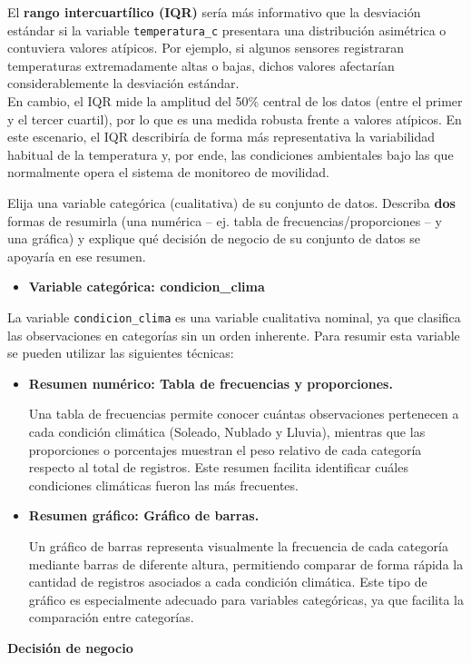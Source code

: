 \documentclass[11pt]{article}
\begin{document}
El \textbf{rango intercuartílico (IQR)} sería más informativo que la desviación estándar si la variable \texttt{temperatura\_c} presentara una distribución asimétrica o contuviera valores atípicos. Por ejemplo, si algunos sensores registraran temperaturas extremadamente altas o bajas, dichos valores afectarían considerablemente la desviación estándar. \\
En cambio, el IQR mide la amplitud del 50\% central de los datos (entre el primer y el tercer cuartil), por lo que es una medida robusta frente a valores atípicos. En este escenario, el IQR describiría de forma más representativa la variabilidad habitual de la temperatura y, por ende, las condiciones ambientales bajo las que normalmente opera el sistema de monitoreo de movilidad.\\

\begin{pregunta}
Elija una variable categórica (cualitativa) de su conjunto de datos. Describa \textbf{dos} formas de resumirla (una numérica -- ej. tabla de frecuencias/proporciones -- y una gráfica) y explique qué decisión de negocio de su conjunto de datos se apoyaría en ese resumen.
\end{pregunta}
\begin{itemize}
    \item \textbf{Variable categórica: condicion\_clima}
\end{itemize}
La variable \texttt{condicion\_clima} es una variable cualitativa nominal, ya que clasifica las observaciones en categorías sin un orden inherente. Para resumir esta variable se pueden utilizar las siguientes técnicas:

\begin{itemize}
    \item \textbf{Resumen numérico: Tabla de frecuencias y proporciones.}

    Una tabla de frecuencias permite conocer cuántas observaciones pertenecen a cada condición climática (Soleado, Nublado y Lluvia), mientras que las proporciones o porcentajes muestran el peso relativo de cada categoría respecto al total de registros. Este resumen facilita identificar cuáles condiciones climáticas fueron las más frecuentes.

    \item \textbf{Resumen gráfico: Gráfico de barras.}

    Un gráfico de barras representa visualmente la frecuencia de cada categoría mediante barras de diferente altura, permitiendo comparar de forma rápida la cantidad de registros asociados a cada condición climática. Este tipo de gráfico es especialmente adecuado para variables categóricas, ya que facilita la comparación entre categorías.
\end{itemize}
\textbf{Decisión de negocio}
\end{document}
